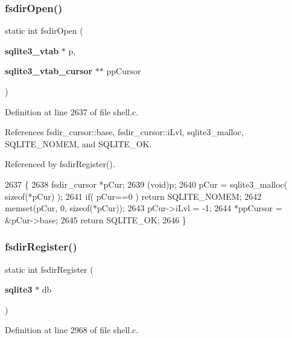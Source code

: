 \subsubsection{fsdir\+Open()}
{\footnotesize\ttfamily static int fsdir\+Open (\begin{DoxyParamCaption}\item[{\textbf{ sqlite3\+\_\+vtab} $\ast$}]{p,  }\item[{\textbf{ sqlite3\+\_\+vtab\+\_\+cursor} $\ast$$\ast$}]{pp\+Cursor }\end{DoxyParamCaption})\hspace{0.3cm}{\ttfamily [static]}}



Definition at line 2637 of file shell.\+c.



References fsdir\+\_\+cursor\+::base, fsdir\+\_\+cursor\+::i\+Lvl, sqlite3\+\_\+malloc, S\+Q\+L\+I\+T\+E\+\_\+\+N\+O\+M\+EM, and S\+Q\+L\+I\+T\+E\+\_\+\+OK.



Referenced by fsdir\+Register().


\begin{DoxyCode}
2637                                                                      \{
2638   fsdir_cursor *pCur;
2639   (void)p;
2640   pCur = sqlite3_malloc( \textcolor{keyword}{sizeof}(*pCur) );
2641   \textcolor{keywordflow}{if}( pCur==0 ) \textcolor{keywordflow}{return} SQLITE_NOMEM;
2642   memset(pCur, 0, \textcolor{keyword}{sizeof}(*pCur));
2643   pCur->iLvl = -1;
2644   *ppCursor = &pCur->base;
2645   \textcolor{keywordflow}{return} SQLITE_OK;
2646 \}
\end{DoxyCode}
\mbox{\label{shell_8c_a27f2af8af9f83312a2bcc2258478e77b}} 
\subsubsection{fsdir\+Register()}
{\footnotesize\ttfamily static int fsdir\+Register (\begin{DoxyParamCaption}\item[{\textbf{ sqlite3} $\ast$}]{db }\end{DoxyParamCaption})\hspace{0.3cm}{\ttfamily [static]}}



Definition at line 2968 of file shell.\+c.



